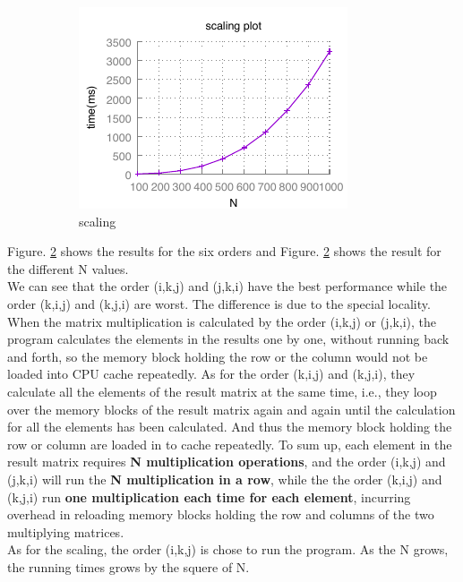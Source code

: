 \documentclass{article}
\begin{document}
\begin{figure}[h!]
\begin{subfigure}[b]{0.3\linewidth}
          \includegraphics[width=\linewidth]{matrix_scaling.pdf}
          \caption{scaling}
          \label{fig:scaling}
        \end{subfigure}
        \caption{\label{fig:part1}}
    \end{figure}

\indent Figure. \ref{fig:part1}  shows the results for the six orders and Figure. \ref{fig:part1}  shows the result for the different N values. \\
\indent We can see that the order (i,k,j) and (j,k,i) have the best performance while the order (k,i,j) and (k,j,i) are worst. The difference is due to the special locality. When the matrix multiplication is calculated by the order (i,k,j) or (j,k,i), the program calculates the elements in the results one by one, without running back and forth, so the memory block holding the row or the column would not be loaded into CPU cache repeatedly. As for the order (k,i,j) and (k,j,i), they calculate all the elements of the result matrix at the same time, i.e., they loop over the memory blocks of the result matrix again and again until the calculation for all the elements has been calculated. And thus the memory block holding the row or column are loaded in to cache repeatedly. To sum up, each element in the result matrix requires \textbf{N multiplication operations}, and the order (i,k,j) and (j,k,i) will run the \textbf{N multiplication in a row}, while the the order (k,i,j) and (k,j,i) run \textbf{one multiplication each time for each element}, incurring overhead in reloading memory blocks holding the row and columns of the two multiplying matrices.\\
\indent As for the scaling, the order (i,k,j) is chose to run the program. As the N grows, the running times grows by the squere of N.
\end{document}
